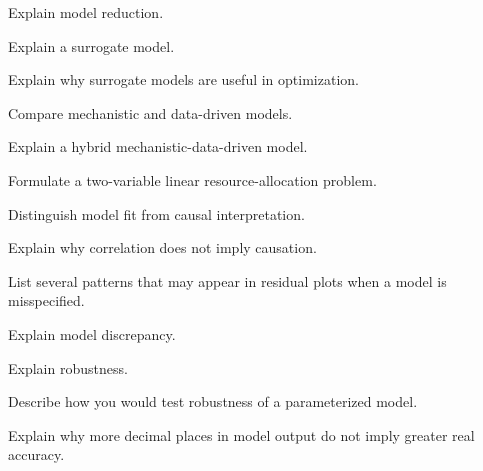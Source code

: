 \begin{exercise}[2]
Explain model reduction.
\end{exercise}

\begin{exercise}[2]
Explain a surrogate model.
\end{exercise}

\begin{exercise}[3]
Explain why surrogate models are useful in optimization.
\end{exercise}

\begin{exercise}[3]
Compare mechanistic and data-driven models.
\end{exercise}

\begin{exercise}[3]
Explain a hybrid mechanistic-data-driven model.
\end{exercise}

\begin{exercise}[2]
Formulate a two-variable linear resource-allocation problem.
\end{exercise}

\begin{exercise}[3]
Distinguish model fit from causal interpretation.
\end{exercise}

\begin{exercise}[3]
Explain why correlation does not imply causation.
\end{exercise}

\begin{exercise}[3]
List several patterns that may appear in residual plots when a model is
misspecified.
\end{exercise}

\begin{exercise}[3]
Explain model discrepancy.
\end{exercise}

\begin{exercise}[3]
Explain robustness.
\end{exercise}

\begin{exercise}[3]
Describe how you would test robustness of a parameterized model.
\end{exercise}

\begin{exercise}[3]
Explain why more decimal places in model output do not imply greater real
accuracy.
\end{exercise}

